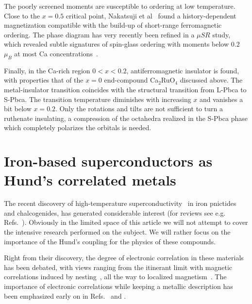 \documentclass[]{ar2e-changed}%
\begin{document}
The poorly screened moments are susceptible to ordering at low temperature. 
Close to the $x=0.5$ critical point, Nakatsuji et
al~\cite{nakatsuji_prl_2003} found a history-dependent magnetization
compatible with the build-up of short-range ferromagnetic ordering. The
phase diagram has very recently been refined in a $\mu SR$ study,
which revealed subtle signatures of spin-glass ordering with moments
below $0.2$\,$\mu_B$ at most Ca concentrations~\cite{carlo_nmat_2012}.

Finally, in the Ca-rich region $0<x<0.2$, antiferromagnetic insulator is
found, with properties that of the $x=0$ end-compound Ca$_2$RuO$_4$
discussed above. The metal-insulator transition coincides with the
structural transition from L-Pbca to S-Pbca. The transition
temperature diminishes with increasing $x$ and vanishes a bit below
$x=0.2$. Only the rotations and tilts are not sufficient to turn a
ruthenate insulating, a compression of the octahedra realized in the
S-Pbca phase which completely polarizes the orbitals is needed.

\section{Iron-based superconductors as Hund's correlated metals}
\label{sec:pnictides}
%
The recent discovery of high-temperature superconductivity~\cite{Kamihara_pnictides1,Kamihara_pnictides2} in
iron pnictides and chalcogenides, has generated considerable interest 
(for reviews see e.g. Refs.~\cite{Hu_Li_AnnualRev_FeSC,stewart_ironSC_rmp_2011}).  
%
Obviously in the limited space of this article we will not attempt to cover the intensive research performed on the subject.
% 
We will rather focus on the importance of the Hund's coupling for the physics of these compounds.

Right from their discovery, the degree of electronic correlation in these materials has been debated, with views ranging 
from the itinerant limit with magnetic correlations
induced by nesting~\cite{Mazin_Splusminus,Xu_Ising_Pnictides}, all the
way to localized magnetism~\cite{Si_Abrahams_J1J2}.
%
The importance of electronic correlations while keeping a metallic
description has been emphasized early on in
Refs.~\cite{Haule_LaOFFeAs_PRL2008} and \cite{haule09}.
\end{document}
